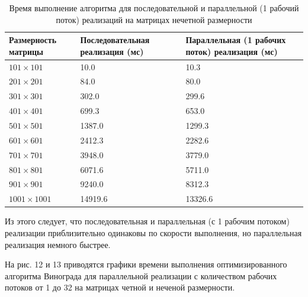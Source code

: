 \documentclass[a4paper,14pt]{article}
\begin{document}
    	 \begin{table} [h!]
    	\begin{center}
    	\caption{Время выполнение алгоритма для последовательной и параллельной (1 рабочий поток) реализаций на матрицах нечетной размерности}
    	\begin{tabular}{|p{5cm}|p{5cm}|p{5cm}|}
    	\hline 
    	Размерность матрицы & Последовательная реализация (мс) & Параллельная (1 рабочих поток) реализация (мс) \\ 
    	\hline 
    	$101 \times 101$ & 10.0 & 10.3 \\ 
    	\hline 
    	$201 \times 201$ & 84.0 & 80.0  \\ 
    	\hline 
    	$301 \times 301$ & 302.0 & 299.6 \\ 
    	\hline 
    	$401 \times 401$ & 699.3 & 653.0 \\ 
    	\hline 
    	$501 \times 501$ & 1387.0 & 1299.3 \\ 
    	\hline 
    	$601 \times 601$ & 2412.3 & 2282.6  \\ 
    	\hline 
    	$701 \times 701$ & 3948.0 & 3779.0  \\ 
    	\hline 
    	$801 \times 801$ & 6071.6 & 5711.0 \\ 
    	\hline 
    	$901 \times 901$ & 9240.0 & 8312.3 \\ 
    	\hline 
    	$1001 \times 1001$ & 14919.6 & 13326.6 \\ 
    	\hline 
    	\end{tabular} 
    	\label{table:table02}
    	\end{center}
    	\end{table}
    	
    	Из этого следует, что последовательная и параллельная (с 1 рабочим потоком) реализации приблизительно одинаковы по скорости выполнения, но параллельная реализация немного быстрее.
    	
        На рис. 12 и 13 приводятся графики времени выполнения оптимизированного алгоритма Винограда для параллельной реализации с количеством рабочих потоков от 1 до 32 на матрицах четной и неченой размерности.
        
\end{document}
